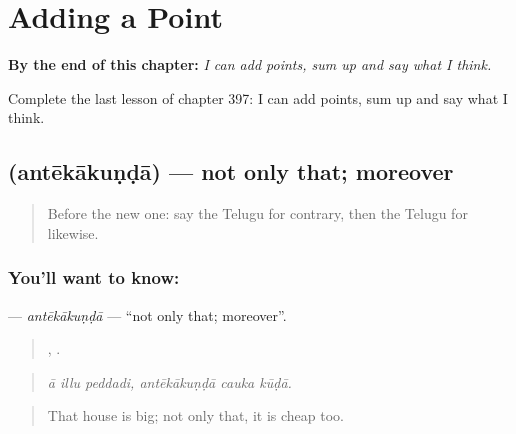 
\chapter{Adding a Point}
\label{ch:te-adding-a-point}

\begin{chapteropening}
\textbf{By the end of this chapter:} \emph{I can add points, sum up and say what I think.}

Complete the last lesson of chapter 397: I can add points, sum up and say what I think.
\end{chapteropening}

\section[\texorpdfstring{\te{అంతేకాకుండా} (antēkākuṇḍā)}{అంతేకాకుండా (antēkākuṇḍā)}]{ (antēkākuṇḍā) — not only that; moreover}

\label{lesson:TE-C397-antekakunda}



\begin{quote}
Before the new one: say the Telugu for contrary, then the Telugu for likewise.
\end{quote}

\subsection*{You'll want to know: }
\textbf{} — \emph{antēkākuṇḍā} — \textquotedblleft{}not only that; moreover\textquotedblright{}.

\begin{quote}
  ,   .
\end{quote}

\begin{quote}
\emph{ā illu peddadi, antēkākuṇḍā cauka kūḍā.}
\end{quote}

\begin{quote}
That house is big; not only that, it is cheap too.
\end{quote}

